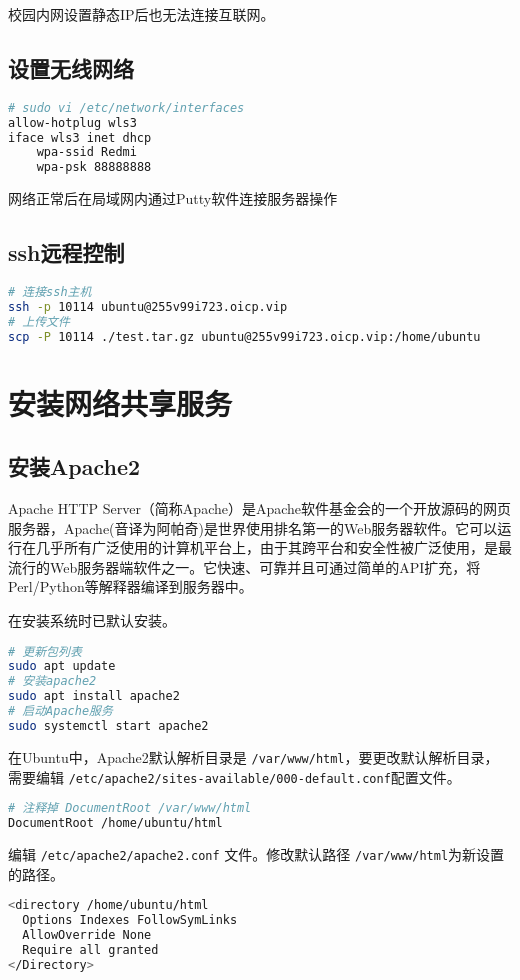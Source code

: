 \documentclass[UTF8,a4paper,12pt]{ctexbook} %
\begin{document}
校园内网设置静态IP后也无法连接互联网。
\subsection{设置无线网络}
\begin{lstlisting}[language={bash}]
# sudo vi /etc/network/interfaces
allow-hotplug wls3
iface wls3 inet dhcp
	wpa-ssid Redmi
	wpa-psk 88888888
\end{lstlisting}


网络正常后在局域网内通过Putty软件连接服务器操作
\subsection{ssh远程控制}
\begin{lstlisting}[language={bash}]
# 连接ssh主机
ssh -p 10114 ubuntu@255v99i723.oicp.vip
# 上传文件
scp -P 10114 ./test.tar.gz ubuntu@255v99i723.oicp.vip:/home/ubuntu
\end{lstlisting}


\section{安装网络共享服务}
\subsection{安装Apache2}
Apache HTTP Server（简称Apache）是Apache软件基金会的一个开放源码的网页服务器，Apache(音译为阿帕奇)是世界使用排名第一的Web服务器软件。它可以运行在几乎所有广泛使用的计算机平台上，由于其跨平台和安全性被广泛使用，是最流行的Web服务器端软件之一。它快速、可靠并且可通过简单的API扩充，将Perl/Python等解释器编译到服务器中。


在安装系统时已默认安装。
\begin{lstlisting}[language={bash}]
# 更新包列表
sudo apt update
# 安装apache2
sudo apt install apache2
# 启动Apache服务
sudo systemctl start apache2
\end{lstlisting}


在Ubuntu中，Apache2默认解析目录是 \verb |/var/www/html|，要更改默认解析目录，需要编辑 \verb |/etc/apache2/sites-available/000-default.conf|配置文件。
\begin{lstlisting}[language={bash}]
# 注释掉 DocumentRoot /var/www/html
DocumentRoot /home/ubuntu/html
\end{lstlisting}


编辑 \verb|/etc/apache2/apache2.conf| 文件。修改默认路径 \verb|/var/www/html|为新设置的路径。
\begin{lstlisting}[language={bash}]
<directory /home/ubuntu/html
  Options Indexes FollowSymLinks
  AllowOverride None
  Require all granted
</Directory>
\end{lstlisting}
\end{document}
